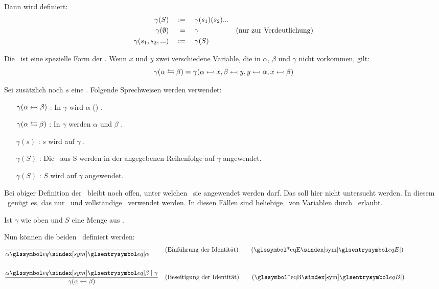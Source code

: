 {Dann wird definiert:
\begin{align}
	\gamma(S) & \quad := \quad \gamma(s_1)(s_2)... \label{def-SubstitutionenAlt}\\
	\gamma(\emptyset) & \quad \; = \quad \gamma & \text{(nur zur Verdeutlichung)}\\
	\gamma(s_1,s_2,...) & \quad := \quad \gamma(S)
\end{align}

Die \Vertauschung\ ist eine spezielle Form der \Substitution.
Wenn $x$ und $y$ zwei verschiedene Variable, die in $\alpha$, $\beta$ und $\gamma$ nicht vorkommen, gilt:
\[
	\gamma(\alpha \leftrightarrows \beta) = \gamma(\alpha\leftarrowtail x, \beta\leftarrowtail y,  y\leftarrowtail\alpha, x \leftarrowtail\beta)
\]

Sei zusätzlich noch $s$ eine \Substitution.
Folgende Sprechweisen werden verwendet:
\begin{itemize}
	\renewcommand*{\itemindent}{1,5cm}
	\renewcommand*{\labelsep}{5pt}
	\item [$\gamma(\alpha \leftarrowtail \beta)$ :] In $\gamma$ wird $\alpha$ () .
	\item [$\gamma(\alpha \leftrightarrows \beta)$ :] In $\gamma$ werden $\alpha$ und $\beta$ .
	\item [$\gamma(s)$ :] $s$ wird auf $\gamma$ .
	\item [$\gamma(S)$ :] Die \Substitutionen\ aus S werden in der angegebenen Reihenfolge auf $\gamma$ angewendet.
	\item [$\gamma(S)$ :] $S$ wird auf $\gamma$ angewendet.
\end{itemize}
%
Bei obiger Definition der \Substitution\ bleibt noch offen, unter welchen \Voraussetzungen\ sie angewendet werden darf. Das soll hier nicht untersucht werden. In diesem \sectionname\ genügt es, das nur \Vertauschung\ und vollständige \Substitution\ verwendet werden.
In diesen Fällen sind beliebige \Substitutionen\ von Variablen durch \Formeln\ erlaubt.

Ist $\gamma$ wie oben und $S$ eine Menge aus \Substitutionen.

Nun können die beiden \Identitaetsregeln\ definiert werden:
\begin{align}
	& \frac{}{\alpha\symeq\alpha}
	& & (\text{Einführung der Identität})
	\tag{\tageqE} \label{def-eqE}
	\\\\
	& \frac{\alpha\symeq\beta \srand \gamma}{\gamma(\alpha\subst\beta)}
	& & (\text{Beseitigung der Identität})
	\tag{\tageqB} \label{def-eqB}
	\formulatoleft
\end{align}

}
